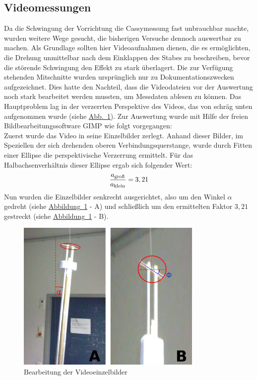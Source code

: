 \documentclass[11pt]{scrartcl}
\newcommand{\ltext}[1]{\ensuremath{_{\textnormal{#1}}}}
\newcommand{\hypref}[2]{\hyperref[#2]{{#1}~\ref{#2}}}
\begin{document}
\subsection{Videomessungen} %
Da die Schwingung der Vorrichtung die Cassymessung fast unbrauchbar machte, wurden weitere Wege gesucht, die bisherigen Versuche dennoch auswertbar zu machen. Als Grundlage sollten hier Videoaufnahmen dienen, die es ermöglichten, die Drehung unmittelbar nach dem Einklappen des Stabes zu beschreiben, bevor die störende Schwingung den Effekt zu stark überlagert. Die zur Verfügung stehenden Mitschnitte wurden ursprünglich nur zu Dokumentationszwecken aufgezeichnet. Dies hatte den Nachteil, dass die Videodateien vor der Auswertung noch stark bearbeitet werden mussten, um Messdaten ablesen zu können. Das Hauptproblem lag in der verzerrten Perspektive des Videos, das von schräg unten aufgenommen wurde (siehe \hypref{Abb.}{Videobearbeitung}). Zur Auswertung wurde mit Hilfe der freien Bildbearbeitungssoftware GIMP wie folgt vorgegangen:\\
Zuerst wurde das Video in seine Einzelbilder zerlegt. Anhand dieser Bilder, im Speziellen der sich drehenden oberen Verbindungsquerstange, wurde durch Fitten einer Ellipse die perspektivische Verzerrung ermittelt. Für das Halbachsenverhältnis dieser Ellipse ergab sich folgender Wert:
\begin{equation}
\frac{a\ltext{groß}}{a\ltext{klein}}=3,21
\end{equation}
Nun wurden die Einzelbilder senkrecht ausgerichtet, also um den Winkel $\alpha$ gedreht (siehe \hypref{Abbildung}{Videobearbeitung} - A) und schließlich um den ermittelten Faktor $3,21$ gestreckt (siehe \hypref{Abbildung}{Videobearbeitung} - B).
\begin{figure}[h]
\begin{center}
\includegraphics[width=0.8\textwidth]{auswert.jpg}
\end{center}
\vspace{-1.5\baselineskip}
\caption{Bearbeitung der Videoeinzelbilder}
\label{Videobearbeitung}
\end{figure}
\end{document}
